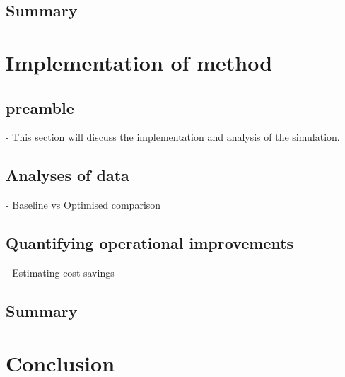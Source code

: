	\subsection{Summary}
\section{Implementation of method}
	\subsection{preamble}
		- This section will discuss the implementation and analysis of the simulation.
	\subsection{Analyses of data}
		- Baseline vs Optimised comparison \\
	\subsection{Quantifying operational improvements}
		- Estimating cost savings
	\subsection{Summary}
\section{Conclusion}

